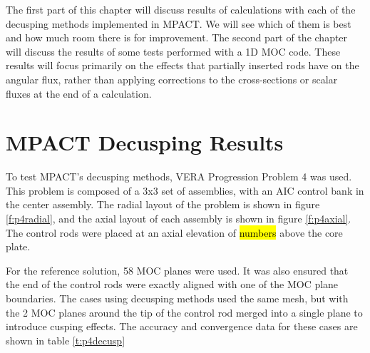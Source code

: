 The first part of this chapter will discuss results of calculations with each of the decusping methods implemented in MPACT.  We will see which of them is best and how much room there is for improvement.  The second part of the chapter will discuss the results of some tests performed with a 1D MOC code.  These results will focus primarily on the effects that partially inserted rods have on the angular flux, rather than applying corrections to the cross-sections or scalar fluxes at the end of a calculation.

\section{MPACT Decusping Results}

To test MPACT's decusping methods, VERA Progression Problem 4 \cite{VERAProgressionProblems} was used.  This problem is composed of a 3x3 set of assemblies, with an AIC control bank in the center assembly.  The radial layout of the problem is shown in figure \ref{f:p4radial}, and the axial layout of each assembly is shown in figure \ref{f:p4axial}.  The control rods were placed at an axial elevation of \hl{numbers} above the core plate. 

For the reference solution, 58 MOC planes were used.  It was also ensured that the end of the control rods were exactly aligned with one of the MOC plane boundaries.  The cases using decusping methods used the same mesh, but with the 2 MOC planes around the tip of the control rod merged into a single plane to introduce cusping effects.  The accuracy and convergence data for these cases are shown in table \ref{t:p4decusp}

